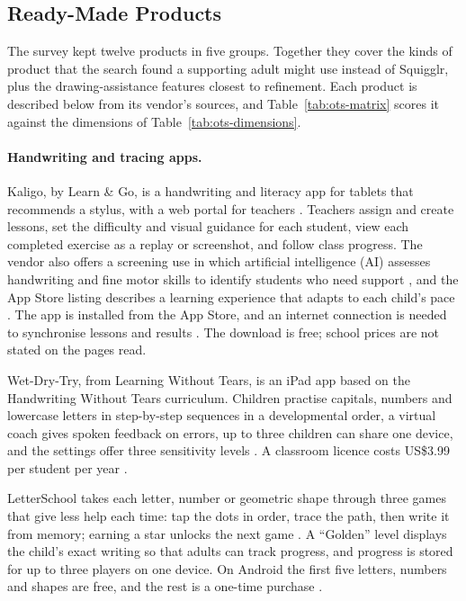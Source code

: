 \documentclass[12pt]{article}
\renewcommand{\_}{\textunderscore\allowbreak}%
\begin{document}
\subsection{Ready-Made Products}
\label{sec:ots-products}
The survey kept twelve products in five groups. Together they cover the kinds of
product that the search found a supporting adult might use instead of Squigglr,
plus the drawing-assistance features closest to refinement. Each product is
described below from its vendor's sources, and Table~\ref{tab:ots-matrix} scores
it against the dimensions of Table~\ref{tab:ots-dimensions}.

\paragraph{Handwriting and tracing apps.}
Kaligo, by Learn \& Go, is a handwriting and literacy app for tablets that
recommends a stylus, with a web portal for teachers
\citep{LearnAndGo2026Kaligo,LearnAndGo2026Requirements}. Teachers assign and
create lessons, set the difficulty and visual guidance for each student, view
each completed exercise as a replay or screenshot, and follow class progress.
The vendor also offers a screening use in which artificial intelligence (AI)
assesses handwriting and fine motor skills to identify students who need support
\citep{LearnAndGo2026Teachers}, and the App Store listing describes a learning
experience that adapts to each child's pace \citep{LearnAndGo2026Kaligo}. The
app is installed from the App Store, and an internet connection is needed to
synchronise lessons and results \citep{LearnAndGo2026Requirements}. The download
is free; school prices are not stated on the pages read.

Wet-Dry-Try, from Learning Without Tears, is an iPad app based on the
Handwriting Without Tears curriculum. Children practise capitals, numbers and
lowercase letters in step-by-step sequences in a developmental order, a virtual
coach gives spoken feedback on errors, up to three children can share one
device, and the settings offer three sensitivity levels
\citep{LearningWithoutTears2026WetDryTryApp}. A classroom licence costs US\$3.99
per student per year \citep{LearningWithoutTears2026WetDryTry}.

LetterSchool takes each letter, number or geometric shape through three games
that give less help each time: tap the dots in order, trace the path, then write
it from memory; earning a star unlocks the next game
\citep{LetterSchool2026HowWhy,LetterSchool2026Play}. A ``Golden'' level displays
the child's exact writing so that adults can track progress, and progress is
stored for up to three players on one device. On Android the first five letters,
numbers and shapes are free, and the rest is a one-time purchase
\citep{LetterSchool2026Play}.
\end{document}
